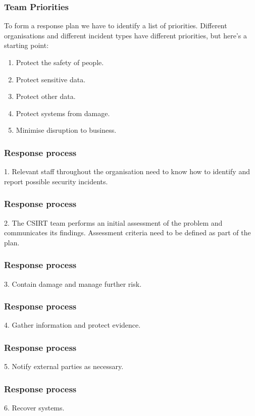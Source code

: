 \documentclass[10pt]{beamer}
\begin{document}
\begin{frame}
    \frametitle{Team Priorities}
     
     To form a response plan we have to identify a list of priorities.  Different
     organisations and different incident types have different priorities, but here's
     a starting point:
     
     \begin{enumerate}
     	\item Protect the safety of people.
     	\item Protect sensitive data.
     	\item Protect other data.
     	\item Protect systems from damage.
     	\item Minimise disruption to business.
     \end{enumerate}
 \end{frame}
     
\begin{frame}
	\frametitle{Response process}
	
	1. Relevant staff throughout the organisation need
	to know how to identify and report possible security 
	incidents.
	
\end{frame}

\begin{frame}
	\frametitle{Response process}
	
	2. The CSIRT team performs an initial assessment of the problem and 
	communicates its findings.  Assessment criteria need to be defined as
	part of the plan.

\end{frame}

\begin{frame}
	\frametitle{Response process}
	
	3. Contain damage and manage further risk.
\end{frame}

\begin{frame}
	\frametitle{Response process}
	
	4. Gather information and protect evidence.
\end{frame}

\begin{frame}
	\frametitle{Response process}
	
	5. Notify external parties as necessary.
\end{frame}

\begin{frame}
	\frametitle{Response process}
	
	6. Recover systems.
\end{frame}
\end{document}
